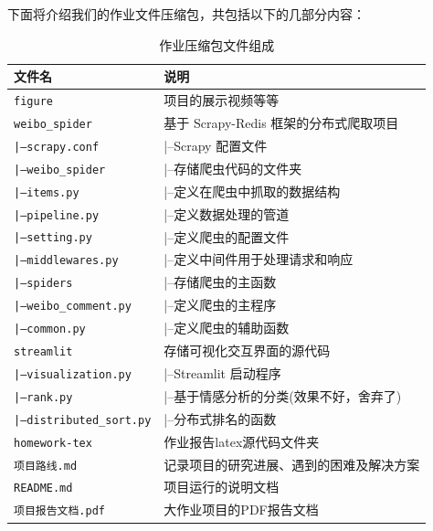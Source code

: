 \documentclass[12pt,hyperref,a4paper,UTF8]{ctexart}
\begin{document}
下面将介绍我们的作业文件压缩包，共包括以下的几部分内容：
\begin{table}[!htbp]
    \centering
    \begin{tabular}{l  | l}
    \hline
        文件名 & 说明 \\
        \hline
        \texttt{figure}  & 项目的展示视频等等\\
        \texttt{weibo\_spider}  & 基于 Scrapy-Redis 框架的分布式爬取项目 \\
        \texttt{\qquad|--scrapy.conf}  & \qquad|--Scrapy 配置文件 \\
        \texttt{\qquad|--weibo\_spider}  & \qquad|--存储爬虫代码的文件夹 \\
        \texttt{\qquad\qquad|--items.py}  & \qquad\qquad|--定义在爬虫中抓取的数据结构 \\
        \texttt{\qquad\qquad|--pipeline.py}  & \qquad\qquad|--定义数据处理的管道 \\
        \texttt{\qquad\qquad|--setting.py} & \qquad\qquad|--定义爬虫的配置文件 \\
        \texttt{\qquad\qquad|--middlewares.py}  & \qquad\qquad|--定义中间件用于处理请求和响应 \\
        \texttt{\qquad\qquad|--spiders}  & \qquad\qquad|--存储爬虫的主函数 \\
        \texttt{\qquad\qquad\qquad|--weibo\_comment.py}  & \qquad\qquad\qquad|--定义爬虫的主程序 \\
        \texttt{\qquad\qquad\qquad|--common.py}  & \qquad\qquad\qquad|--定义爬虫的辅助函数 \\
        \texttt{streamlit}  & 存储可视化交互界面的源代码 \\
        \texttt{\qquad|--visualization.py}  & \qquad|--Streamlit 启动程序 \\
        \texttt{\qquad|--rank.py}  & \qquad|--基于情感分析的分类(效果不好，舍弃了) \\
        \texttt{\qquad|--distributed\_sort.py}  & \qquad|--分布式排名的函数 \\        
        \texttt{homework-tex}  & 作业报告latex源代码文件夹 \\
        \texttt{项目路线.md}  & 记录项目的研究进展、遇到的困难及解决方案 \\
        \texttt{README.md}  & 项目运行的说明文档 \\
        \texttt{项目报告文档.pdf}  & 大作业项目的PDF报告文档 \\
        \hline
    \end{tabular}
    \caption{作业压缩包文件组成}
    \label{doc}
\end{table}
\vspace{2cm}
\end{document}
